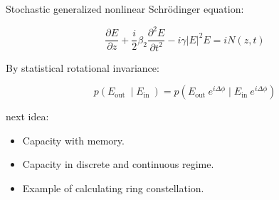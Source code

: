 Stochastic generalized nonlinear Schrödinger equation:

\begin{equation}
\frac{\partial E}{\partial z}+\frac{i}{2} \beta_{2} \frac{\partial^{2} E}{\partial t^{2}}-i \gamma|E|^{2} E=i N(z, t)
\end{equation}

By statistical rotational invariance:

\begin{equation}
p\left(E_{\text {out }} \mid E_{\text {in }}\right)=p\left(E_{\text {out }} e^{i \Delta \phi} \mid E_{\text {in }} e^{i \Delta \phi}\right)
\end{equation}

next idea:
\begin{itemize}
\item Capacity with memory.
\item Capacity in discrete and continuous regime.
\item Example of calculating ring constellation.
\end{itemize}